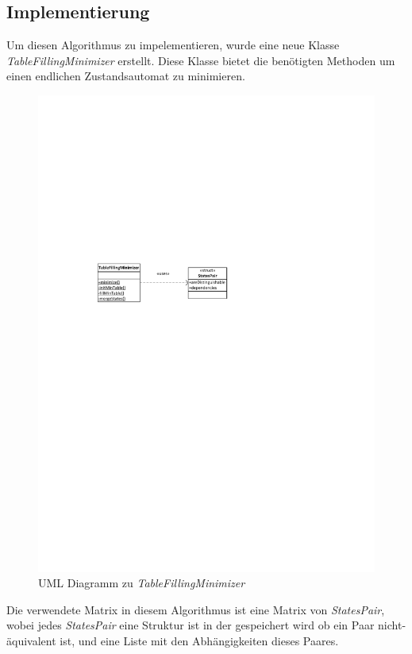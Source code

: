 \subsection{Implementierung}
\cite{minimization4,minimization5}
Um diesen Algorithmus zu impelementieren, wurde eine neue Klasse
\textit{TableFillingMinimizer} erstellt. Diese Klasse bietet die benötigten
Methoden um einen endlichen Zustandsautomat zu minimieren.

\begin{figure}[h]
  \begin{center}
  \includegraphics{objectsToInclude/TableFillingMinimizer.pdf}
  \caption{UML Diagramm zu \textit{TableFillingMinimizer}}
  \label{fig:UMLminTable}
  \end{center}
\end{figure}

Die verwendete Matrix in diesem Algorithmus ist eine Matrix von
\textit{StatesPair}, wobei jedes \textit{StatesPair} eine Struktur ist in der
gespeichert wird ob ein Paar nicht-äquivalent ist, und eine Liste mit den
Abhängigkeiten dieses Paares.
